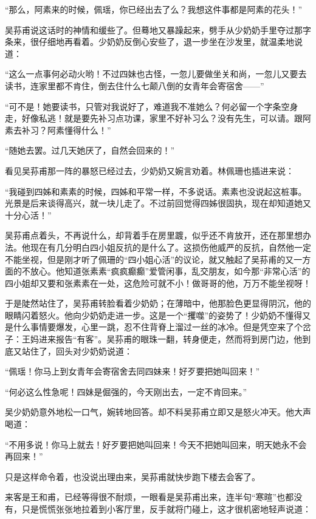 \par “那么，阿素来的时候，佩瑶，你已经出去了么？我想这件事都是阿素的花头！”
\par 吴荪甫说这话时的神情和缓些了。但蓦地又暴躁起来，劈手从少奶奶手里夺过那字条来，很仔细地再看着。少奶奶反倒心安些了，退一步坐在沙发里，就温柔地说道：
\par “这么一点事何必动火哟！不过四妹也古怪，一忽儿要做坐关和尚，一忽儿又要去读书，连家里都不肯住，倒去住什么七颠八倒的女青年会寄宿舍——”
\par “可不是！她要读书，只管对我说好了，难道我不准她么？何必留一个字条空身走，好像私逃！就是要先补习点功课，家里不好补习么？没有先生，可以请。跟阿素去补习？阿素懂得什么！”
\par “随她去罢。过几天她厌了，自然会回来的！”
\par 看见吴荪甫那一阵的暴怒已经过去，少奶奶又婉言劝着。林佩珊也插进来说：
\par “我碰到四姊和素素的时候，四姊和平常一样，不多说话。素素也没说起这桩事。光景是后来谈得高兴，就一块儿走了。不过前回觉得四姊很固执，现在却知道她又十分心活！”
\par 吴荪甫点着头，不再说什么，却背着手在房里踱，似乎还不肯放开，还在那里想办法。他现在有几分明白四小姐反抗的是什么了。这损伤他威严的反抗，自然他一定不能坐视，但是刚才听了佩珊的“四小姐心活”的议论，就又触起了吴荪甫的又一方面的不放心。他知道张素素“疯疯癫癫”爱管闲事，乱交朋友，如今那“非常心活”的四小姐却又要和张素素在一处，这危险可就不小！做哥哥的他，万万不能坐视呀！
\par 于是陡然站住了，吴荪甫转脸看着少奶奶；在薄暗中，他那脸色更显得阴沉，他的眼睛闪着怒火。他向少奶奶走进一步。这是一个“攫噬”的姿势了！少奶奶不懂得又是什么事情要爆发，心里一跳，忍不住背脊上溜过一丝的冰冷。但是凭空来了个岔子：王妈进来报告“有客”。吴荪甫的眼珠一翻，转身便走，然而将到房门边，他到底又站住了，回头对少奶奶说道：
\par “佩瑶！你马上到女青年会寄宿舍去同四妹来！好歹要把她叫回来！”
\par “何必这么性急呢！四妹是倔强的，今天刚出去，一定不肯回来。”
\par 吴少奶奶意外地松一口气，婉转地回答。却不料吴荪甫立即又是怒火冲天。他大声喝道：
\par “不用多说！你马上就去！好歹要把她叫回来！今天不把她叫回来，明天她永不会再回来！”
\par 只是这样命令着，也没说出理由来，吴荪甫就快步跑下楼去会客了。
\par 来客是王和甫，已经等得很不耐烦，一眼看是吴荪甫出来，连半句“寒暄”也都没有，只是慌慌张张地拉着到小客厅里，反手就将门碰上，这才很机密地轻声说道：
